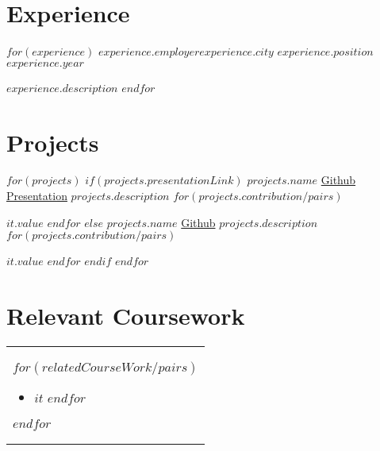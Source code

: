 \documentclass[$documentclass.fontsize$, $documentclass.papersize$]{$documentclass.class$}
\begin{document}
\vspace{-.5cm} %

\section*{Experience}
  \subHeadingBulletListStart
    $for(experience)$
      \subHeadingBulletListText
        {$experience.employer$}{$experience.city$}
        {$experience.position$}{$experience.year$}
        \bulletListStart
          \item{$experience.description$}
        \bulletListEnd
    $endfor$
  \subHeadingBulletListEnd

\vspace{-.5cm} %

\section*{Projects}
  \subHeadingBulletListStart
      $for(projects)$
        $if(projects.presentationLink)$ %
          \makeProjectRowPres
            {$projects.name$}
              {\href{$projects.githubLink$}{Github}}
              {\href{$projects.presentationLink$}{Presentation}}
            {$projects.description$}
            \bulletListStart
              $for(projects.contribution/pairs)$
                \item{$it.value$}\vspace{-.2cm}
              $endfor$
            \bulletListEnd
        $else$
          \makeProjectRowNoPres
            {$projects.name$}
              {\href{$projects.githubLink$}{Github}}
            {$projects.description$}
            \bulletListStart
              $for(projects.contribution/pairs)$
                \item{$it.value$}\vspace{-.2cm}
              $endfor$
            \bulletListEnd
        $endif$
      $endfor$
  \subHeadingBulletListEnd

\vspace{-.5cm} %

\section*{Relevant Coursework}
\begin{tabular}[t]{ @{}p{\textwidth} } %
  $for(relatedCourseWork/pairs)$
    \begin{minipage}[t]{.35\textwidth}
      \begin{itemize}[itemsep=-3pt,leftmargin=*]
        $for(it.value)$ %
          \item{$it$}
        $endfor$
      \end{itemize}
    \end{minipage}
  $endfor$
\end{tabular}
\end{document}
